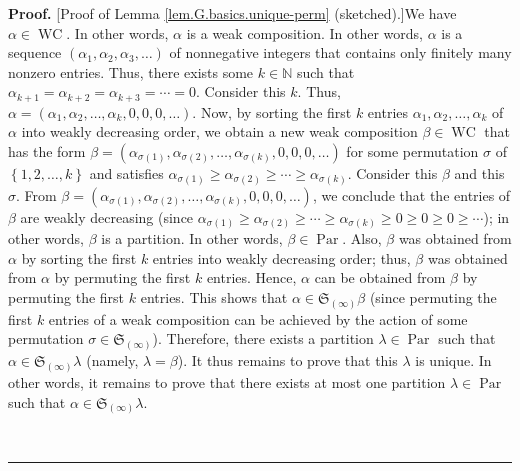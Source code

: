 \documentclass[numbers=enddot,12pt,final,onecolumn,notitlepage]{scrartcl}%
\theoremstyle{definition}
\newenvironment{proof}[1][Proof]{\noindent\textbf{#1.} }{\ \rule{0.5em}{0.5em}}
\newenvironment{verlong}{}{}
\begin{document}
\begin{verlong}
\begin{proof}
[Proof of Lemma \ref{lem.G.basics.unique-perm} (sketched).]We have $\alpha
\in\operatorname*{WC}$. In other words, $\alpha$ is a weak composition. In
other words, $\alpha$ is a sequence $\left(  \alpha_{1},\alpha_{2},\alpha
_{3},\ldots\right)  $ of nonnegative integers that contains only finitely many
nonzero entries. Thus, there exists some $k\in\mathbb{N}$ such that
$\alpha_{k+1}=\alpha_{k+2}=\alpha_{k+3}=\cdots=0$. Consider this $k$. Thus,
$\alpha=\left(  \alpha_{1},\alpha_{2},\ldots,\alpha_{k},0,0,0,\ldots\right)
$. Now, by sorting the first $k$ entries $\alpha_{1},\alpha_{2},\ldots
,\alpha_{k}$ of $\alpha$ into weakly decreasing order, we obtain a new weak
composition $\beta\in\operatorname*{WC}$ that has the form $\beta=\left(
\alpha_{\sigma\left(  1\right)  },\alpha_{\sigma\left(  2\right)  }%
,\ldots,\alpha_{\sigma\left(  k\right)  },0,0,0,\ldots\right)  $ for some
permutation $\sigma$ of $\left\{  1,2,\ldots,k\right\}  $ and satisfies
$\alpha_{\sigma\left(  1\right)  }\geq\alpha_{\sigma\left(  2\right)  }%
\geq\cdots\geq\alpha_{\sigma\left(  k\right)  }$. Consider this $\beta$ and
this $\sigma$. From $\beta=\left(  \alpha_{\sigma\left(  1\right)  }%
,\alpha_{\sigma\left(  2\right)  },\ldots,\alpha_{\sigma\left(  k\right)
},0,0,0,\ldots\right)  $, we conclude that the entries of $\beta$ are weakly
decreasing (since $\alpha_{\sigma\left(  1\right)  }\geq\alpha_{\sigma\left(
2\right)  }\geq\cdots\geq\alpha_{\sigma\left(  k\right)  }\geq0\geq0\geq
0\geq\cdots$); in other words, $\beta$ is a partition. In other words,
$\beta\in\operatorname*{Par}$. Also, $\beta$ was obtained from $\alpha$ by
sorting the first $k$ entries into weakly decreasing order; thus, $\beta$ was
obtained from $\alpha$ by permuting the first $k$ entries. Hence, $\alpha$ can
be obtained from $\beta$ by permuting the first $k$ entries. This shows that
$\alpha\in\mathfrak{S}_{\left(  \infty\right)  }\beta$ (since permuting the
first $k$ entries of a weak composition can be achieved by the action of some
permutation $\sigma\in\mathfrak{S}_{\left(  \infty\right)  }$). Therefore,
there exists a partition $\lambda\in\operatorname*{Par}$ such that $\alpha
\in\mathfrak{S}_{\left(  \infty\right)  }\lambda$ (namely, $\lambda=\beta$).
It thus remains to prove that this $\lambda$ is unique. In other words, it
remains to prove that there exists at most one partition $\lambda
\in\operatorname*{Par}$ such that $\alpha\in\mathfrak{S}_{\left(
\infty\right)  }\lambda$.


\end{proof}
\end{verlong}
\end{document}
